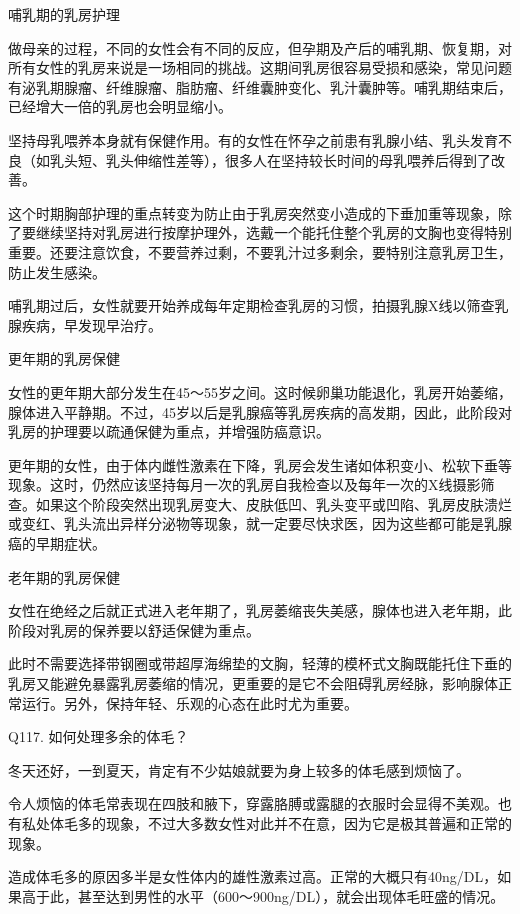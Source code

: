 \documentclass[12pt,UTF8]{ctexbook}
\begin{document}
哺乳期的乳房护理

做母亲的过程，不同的女性会有不同的反应，但孕期及产后的哺乳期、恢复期，对所有女性的乳房来说是一场相同的挑战。这期间乳房很容易受损和感染，常见问题有泌乳期腺瘤、纤维腺瘤、脂肪瘤、纤维囊肿变化、乳汁囊肿等。哺乳期结束后，已经增大一倍的乳房也会明显缩小。

坚持母乳喂养本身就有保健作用。有的女性在怀孕之前患有乳腺小结、乳头发育不良（如乳头短、乳头伸缩性差等），很多人在坚持较长时间的母乳喂养后得到了改善。

这个时期胸部护理的重点转变为防止由于乳房突然变小造成的下垂加重等现象，除了要继续坚持对乳房进行按摩护理外，选戴一个能托住整个乳房的文胸也变得特别重要。还要注意饮食，不要营养过剩，不要乳汁过多剩余，要特别注意乳房卫生，防止发生感染。

哺乳期过后，女性就要开始养成每年定期检查乳房的习惯，拍摄乳腺X线以筛查乳腺疾病，早发现早治疗。

更年期的乳房保健

女性的更年期大部分发生在45～55岁之间。这时候卵巢功能退化，乳房开始萎缩，腺体进入平静期。不过，45岁以后是乳腺癌等乳房疾病的高发期，因此，此阶段对乳房的护理要以疏通保健为重点，并增强防癌意识。

更年期的女性，由于体内雌性激素在下降，乳房会发生诸如体积变小、松软下垂等现象。这时，仍然应该坚持每月一次的乳房自我检查以及每年一次的X线摄影筛查。如果这个阶段突然出现乳房变大、皮肤低凹、乳头变平或凹陷、乳房皮肤溃烂或变红、乳头流出异样分泌物等现象，就一定要尽快求医，因为这些都可能是乳腺癌的早期症状。

老年期的乳房保健

女性在绝经之后就正式进入老年期了，乳房萎缩丧失美感，腺体也进入老年期，此阶段对乳房的保养要以舒适保健为重点。

此时不需要选择带钢圈或带超厚海绵垫的文胸，轻薄的模杯式文胸既能托住下垂的乳房又能避免暴露乳房萎缩的情况，更重要的是它不会阻碍乳房经脉，影响腺体正常运行。另外，保持年轻、乐观的心态在此时尤为重要。





Q117. 如何处理多余的体毛？


冬天还好，一到夏天，肯定有不少姑娘就要为身上较多的体毛感到烦恼了。

令人烦恼的体毛常表现在四肢和腋下，穿露胳膊或露腿的衣服时会显得不美观。也有私处体毛多的现象，不过大多数女性对此并不在意，因为它是极其普遍和正常的现象。

造成体毛多的原因多半是女性体内的雄性激素过高。正常的大概只有40ng/DL，如果高于此，甚至达到男性的水平（600～900ng/DL），就会出现体毛旺盛的情况。
\end{document}
